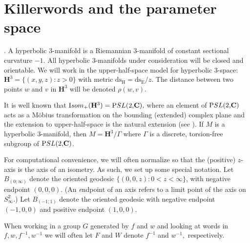 \def\Relength{{\textrm Relength}}
\def\length{{\textrm length}}
\def\Arccosh{{\textrm Arccosh}}
\def\trace{{\textrm trace}}
\def\distance{{\textrm distance}}

\vglue-8pt
\chapter{Killerwords and the parameter space}\label{Ch.WordsParams} %
\vglue-4pt

\begin{notationsandconventions}\label{GMT 1.1}.
A hyperbolic $3$-manifold is a Riemannian $3$-manifold of constant sectional curvature $-1$.  All hyperbolic $3$-manifolds under
consideration will be closed and orientable. We will work in the upper-half-space model for
hyperbolic 3-space:  $\mathbf {H}^3 = \{(x,y,z): z > 0\}$ with 
metric $\mathrm {ds_H} = \mathrm {ds_E}/z.$ The distance between two points $w$ and $v$ in $\mathbf {H}^3$ will be denoted $\rho(w,v).$

It is well known that  
${\textrm Isom}_+(\mathbf {H}^3) = {\textrm PSL(2,}\mathbf {C}),$  
where an element of
${\textrm PSL(2,}\mathbf {C})$ acts as a M\"obius transformation on the bounding (extended) complex plane and the extension to upper-half-space is the natural extension
 (see \cite{Bea}).  
If $M$ is a hyperbolic $3$-manifold, then $M=\mathbf {H}^3/\Gamma$ where $\Gamma$ is a 
discrete, torsion-free subgroup of ${\textrm PSL(2,}\mathbf {C})$.   

For computational convenience, we will often normalize so that the (positive) $z$-axis is the axis of an isometry.  As such, we set up some special notation.
Let $B_{(0;\infty)}$ denote the oriented geodesic $\{(0,0,z): 0< z < \infty \}$,
with negative endpoint $(0,0,0).$  (An {\textit endpoint} of an axis refers to a limit point of the axis on $S^2_{\infty}$.) Let $B_{(-1;1)}$ denote the
oriented geodesic with negative endpoint $(-1,0,0)$ and positive endpoint $(1,0,0)$.

When working in a group $G$ generated by $f$ and $w$ and looking 
at words in $f,w, f^{-1}, w^{-1}$ we will often let $F$ and $W$ denote
$f^{-1}$ and $w^{-1},$ respectively.
\end{notationsandconventions}

